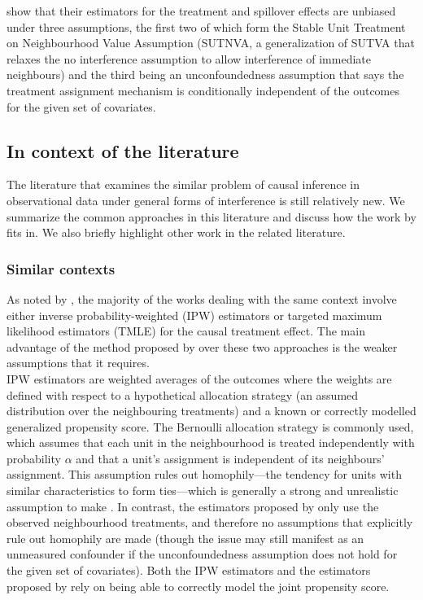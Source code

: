 \documentclass[10pt]{article}
\begin{document}
\textcite{Forastiere:2021} show that their estimators for the treatment and spillover effects are unbiased under three assumptions, the first two of which form the Stable Unit Treatment on Neighbourhood Value Assumption (SUTNVA, a generalization of SUTVA that relaxes the no interference assumption to allow interference of immediate neighbours) and the third being an unconfoundedness assumption that says the treatment assignment mechanism is conditionally independent of the outcomes for the given set of covariates.

\subsection{In context of the literature}

The literature that examines the similar problem of causal inference in observational data under general forms of interference is still relatively new. We summarize the common approaches in this literature and discuss how the work by \textcite{Forastiere:2021} fits in. We also briefly highlight other work in the related literature.

\subsubsection{Similar contexts}

As noted by \citeauthor{Forastiere:2021}, the majority of the works dealing with the same context involve either inverse probability-weighted (IPW) estimators \parencite{Liu:2016} or targeted maximum likelihood estimators (TMLE) \parencite{VanDerLaan:2014,Sofrygin:2017,Ogburn:2017} for the causal treatment effect. The main advantage of the method proposed by \textcite{Forastiere:2021} over these two approaches is the weaker assumptions that it requires.
\\

IPW estimators are weighted averages of the outcomes where the weights are defined with respect to a hypothetical allocation strategy (an assumed distribution over the neighbouring treatments) and a known or correctly modelled generalized propensity score. The Bernoulli allocation strategy \parencite{Tchetgen:2012} is commonly used, which assumes that each unit in the neighbourhood is treated independently with probability $\alpha$ and that a unit's assignment is independent of its neighbours' assignment. This assumption rules out homophily---the tendency for units with similar characteristics to form ties---which is generally a strong and unrealistic assumption to make \parencite{Shalizi:2011}. In contrast, the estimators proposed by \textcite{Forastiere:2021} only use the observed neighbourhood treatments, and therefore no assumptions that explicitly rule out homophily are made (though the issue may still manifest as an unmeasured confounder if the unconfoundedness assumption does not hold for the given set of covariates). Both the IPW estimators and the estimators proposed by \textcite{Forastiere:2021} rely on being able to correctly model the joint propensity score.
\\
\end{document}
